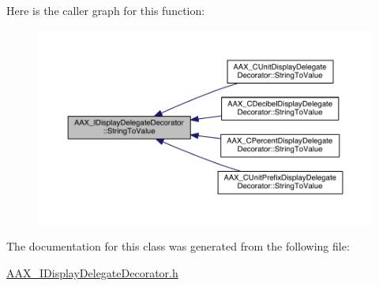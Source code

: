 Here is the caller graph for this function\+:
\nopagebreak
\begin{figure}[H]
\begin{center}
\leavevmode
\includegraphics[width=350pt]{a00094_a18d19293f3eca619cb5bb7f1ffde1a8d_icgraph}
\end{center}
\end{figure}




The documentation for this class was generated from the following file\+:\begin{DoxyCompactItemize}
\item 
\hyperlink{a00242}{A\+A\+X\+\_\+\+I\+Display\+Delegate\+Decorator.\+h}\end{DoxyCompactItemize}
